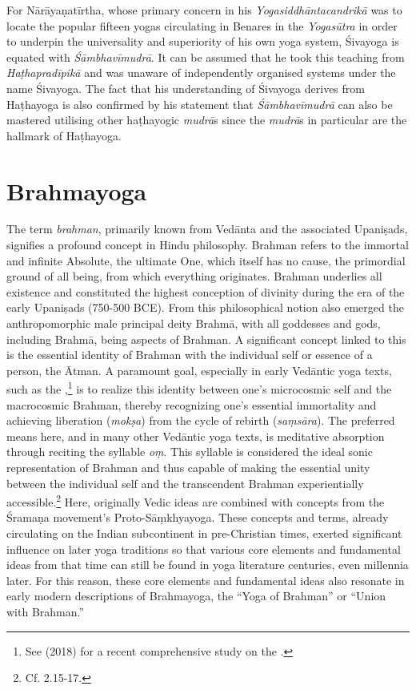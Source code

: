 For Nārāyaṇatīrtha, whose primary concern in his \emph{Yogasiddhāntacandrikā} was to locate the popular fifteen yogas circulating in Benares in the \emph{Yogasūtra} in order to underpin the universality and superiority of his own yoga system, Śivayoga is equated with \emph{Śāmbhavīmudrā}. It can be assumed that he took this teaching from \emph{Haṭhapradīpikā} and was unaware of independently organised systems under the name Śivayoga. The fact that his understanding of Śivayoga derives from Haṭhayoga is also confirmed by his statement that \emph{Śāmbhavīmudrā} can also be mastered utilising other haṭhayogic \textit{mudrā}s since the \emph{mudrā}s in particular are the hallmark of Haṭhayoga.

\section{Brahmayoga}
\label{brahmayogaintro}

The term \emph{brahman}, primarily known from Vedānta and the associated Upaniṣads, signifies a profound concept in Hindu philosophy. Brahman refers to the immortal and infinite Absolute, the ultimate One, which itself has no cause, the primordial ground of all being, from which everything originates. Brahman underlies all existence and constituted the highest conception of divinity during the era of the early Upaniṣads (750-500 BCE). From this philosophical notion also emerged the anthropomorphic male principal deity Brahmā, with all goddesses and gods, including Brahmā, being aspects of Brahman. A significant concept linked to this is the essential identity of Brahman with the individual self or essence of a person, the Ātman. A paramount goal, especially in early Vedāntic yoga texts, such as the ,\footnote{See \citeauthor{haas2018vom} (2018) for a recent comprehensive study on the .} is to realize this identity between one's microcosmic self and the macrocosmic Brahman, thereby recognizing one's essential immortality and achieving liberation (\textit{mokṣa}) from the cycle of rebirth (\textit{saṃsāra}). The preferred means here, and in many other Vedāntic yoga texts, is meditative absorption through reciting the syllable \textit{oṃ}. This syllable is considered the ideal sonic representation of Brahman and thus capable of making the essential unity between the individual self and the transcendent Brahman experientially accessible.\footnote{Cf.  2.15-17.} Here, originally Vedic ideas are combined with concepts from the Śramaṇa movement's Proto-Sāṃkhyayoga. These concepts and terms, already circulating on the Indian subcontinent in pre-Christian times, exerted significant influence on later yoga traditions so that various core elements and fundamental ideas from that time can still be found in yoga literature centuries, even millennia later. For this reason, these core elements and fundamental ideas also resonate in early modern descriptions of Brahmayoga, the ``Yoga of Brahman'' or ``Union with Brahman.''

